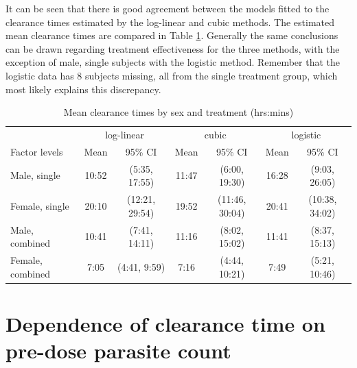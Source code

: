 It can be seen that there is good agreement between the models fitted to the clearance times estimated by the log-linear and cubic methods. The estimated mean clearance times are compared in Table \ref{compinf}. Generally the same conclusions can be drawn regarding treatment effectiveness for the three methods, with the exception of male, single subjects with the logistic method. Remember that the logistic data has 8 subjects missing, all from the single treatment group, which most likely explains this discrepancy.
\begin{table}[h]
\centering
\caption{Mean clearance times by sex and treatment (hrs:mins)}\label{compinf}
\begin{tabular}{|l|cc|cc|cc|}
\hline
&\multicolumn{2}{c|}{log-linear}&\multicolumn{2}{c|}{cubic}&\multicolumn{2}{c|}{logistic}\\
Factor levels&Mean&95\% CI&Mean&95\% CI&Mean&95\% CI\\
\hline
Male, single 		& 10:52 & (5:35, 17:55) &11:47& (6:00, 19:30) & 16:28 &(9:03, 26:05)\\
Female, single		& 20:10 & (12:21,  29:54) &19:52&(11:46, 30:04) & 20:41&(10:38, 34:02)\\
Male, combined 	& 10:41 & (7:41, 14:11) &11:16&(8:02, 15:02) & 11:41 &(8:37, 15:13)\\
Female, combined 	& 7:05 & (4:41, 9:59) &7:16&(4:44, 10:21) & 7:49 & (5:21, 10:46)\\
\hline
\end{tabular}
\end{table}

\section{Dependence of clearance time on pre-dose parasite count}
